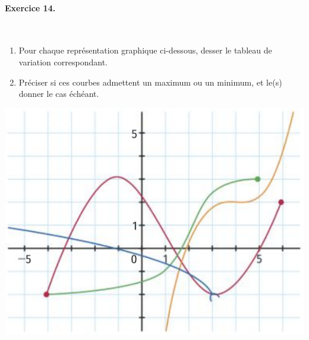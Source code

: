 \documentclass[11pt]{article}
\begin{document}
\paragraph{Exercice 14.}~\\[-7mm]
\begin{minipage}{.5\textwidth}
  \begin{enumerate}
    \item Pour chaque représentation graphique ci-dessous, desser le tableau de
  variation correspondant.
    \item Préciser si ces courbes admettent un maximum ou un minimum, et le(s)
  donner le cas échéant.
  \end{enumerate}
\end{minipage}
\begin{minipage}{.5\textwidth}
  \begin{center}
    \includegraphics[scale=.3]{4courbes2.png}
  \end{center}
\end{minipage}
\end{document}
